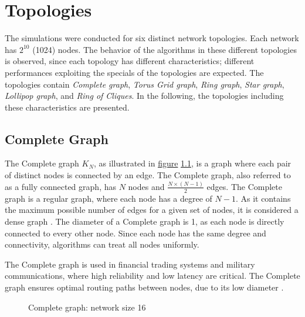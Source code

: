 \chapter{Topologies}\label{chap:topologies}
The simulations were conducted for six distinct network topologies. Each network has $2^{10}$ (1024) nodes. The behavior of the algorithms in these different topologies is observed, since each topology has different characteristics; different performances exploiting the specials of the topologies are expected. The topologies contain \textit{Complete graph}, \textit{Torus Grid graph}, \textit{Ring graph}, \textit{Star graph}, \textit{Lollipop graph}, and \textit{Ring of Cliques}. In the following, the topologies including these characteristics are presented.

\section{Complete Graph}\label{sec:2completegraph}
The Complete graph $K_N$, as illustrated in \hyperref[fig:completegraphDemo]{figure} \ref{fig:completegraphDemo}, is a graph where each pair of distinct nodes is connected by an edge. The Complete graph, also referred to as a fully connected graph, has $N$ nodes and $\frac{N\times(N-1)}{2}$ edges. The Complete graph is a regular graph, where each node has a degree of $N-1$. As it contains the maximum possible number of edges for a given set of nodes, it is considered a dense graph \cite{GraphTheorySchindelhaauer2021}. The diameter of a Complete graph is 1, as each node is directly connected to every other node. Since each node has the same degree and connectivity, algorithms can treat all nodes uniformly.

The Complete graph is used in financial trading systems and military communications, where high reliability and low latency are critical. The Complete graph ensures optimal routing paths between nodes, due to its low diameter \cite{Banerjee2001}.

\begin{figure}[H]
    \centering
    
    \caption{Complete graph: network size 16}
    \label{fig:completegraphDemo}
\end{figure}


